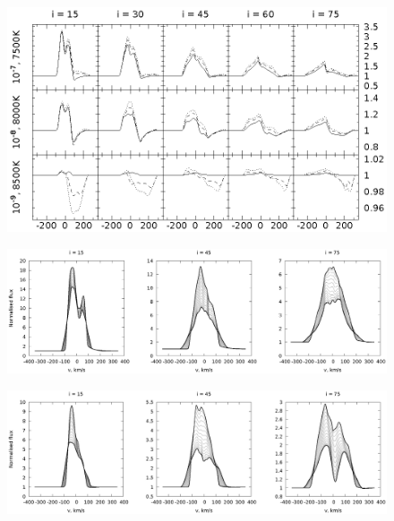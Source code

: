 \documentclass{article}
\begin{document}
\begin{figure}[h]
\centering
\includegraphics[width=\textwidth]{hot_5_Brg.eps}
\caption{\rm}
\label{fig:Brg}
\end{figure}

\begin{figure}[h]
\centering
\includegraphics[width=\textwidth]{rot_7.eps}
\caption{\rm}
\label{fig:rot7}
\end{figure}

\begin{figure}[h]
\centering
\includegraphics[width=\textwidth]{rot_8.eps}
\caption{\rm}
\label{fig:rot8}
\end{figure}
\end{document}
